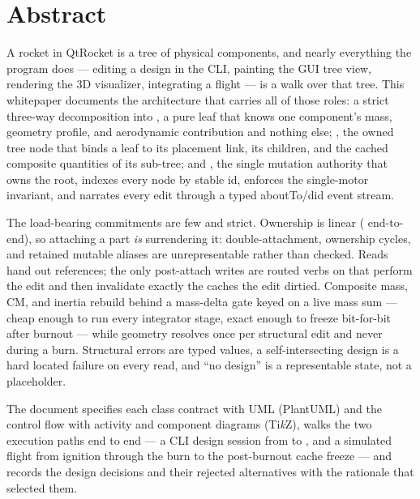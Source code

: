 \documentclass[11pt,letterpaper]{article}
\begin{document}
\setcounter{page}{2}
\section*{Abstract}
A rocket in QtRocket is a tree of physical components, and nearly everything the program does ---
editing a design in the CLI, painting the GUI tree view, rendering the 3D visualizer, integrating a
flight --- is a walk over that tree. This whitepaper documents the architecture that carries all of
those roles: a strict three-way decomposition into \textbf{}, a pure leaf that knows one
component's mass, geometry profile, and aerodynamic contribution and nothing else;
\textbf{}, the owned tree node that binds a leaf to its placement link, its children,
and the cached composite quantities of its sub-tree; and \textbf{}, the single
mutation authority that owns the root, indexes every node by stable id, enforces the single-motor
invariant, and narrates every edit through a typed aboutTo/did event stream.

The load-bearing commitments are few and strict. Ownership is linear (
end-to-end), so attaching a part \emph{is} surrendering it: double-attachment, ownership cycles, and
retained mutable aliases are unrepresentable rather than checked. Reads hand out 
references; the only post-attach writes are routed verbs on  that perform the edit
and then invalidate exactly the caches the edit dirtied. Composite mass, CM, and inertia rebuild
behind a mass-delta gate keyed on a live mass sum --- cheap enough to run every integrator stage,
exact enough to freeze bit-for-bit after burnout --- while geometry resolves once per structural
edit and never during a burn. Structural errors are typed values, a self-intersecting design is a
hard located failure on every read, and ``no design'' is a representable state, not a placeholder.

The document specifies each class contract with UML (PlantUML) and the control flow with activity
and component diagrams (Ti\emph{k}Z), walks the two execution paths end to end --- a CLI design
session from  to , and a simulated flight from ignition through
the burn to the post-burnout cache freeze --- and records the design decisions and their rejected
alternatives with the rationale that selected them.
\end{document}
